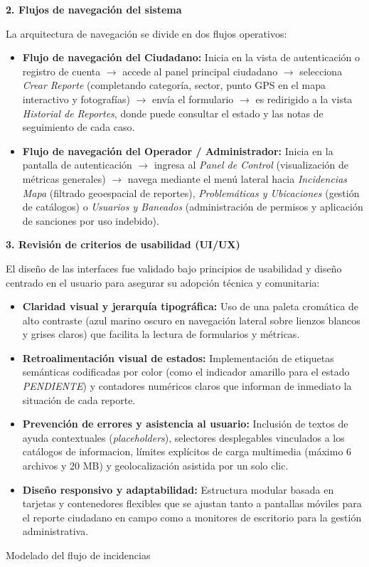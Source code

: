 { \vspace{0.5cm}
 \noindent\textbf{2. Flujos de navegación del sistema}
 \vspace{0.2cm}
 
 La arquitectura de navegación se divide en dos flujos operativos:
 \begin{itemize}
 	\item \textbf{Flujo de navegación del Ciudadano:} Inicia en la vista de autenticación o registro de cuenta $\rightarrow$ accede al panel principal ciudadano $\rightarrow$ selecciona \textit{Crear Reporte} (completando categoría, sector, punto GPS en el mapa interactivo y fotografías) $\rightarrow$ envía el formulario $\rightarrow$ es redirigido a la vista \textit{Historial de Reportes}, donde puede consultar el estado y las notas de seguimiento de cada caso.
 	\item \textbf{Flujo de navegación del Operador / Administrador:} Inicia en la pantalla de autenticación $\rightarrow$ ingresa al \textit{Panel de Control} (visualización de métricas generales) $\rightarrow$ navega mediante el menú lateral hacia \textit{Incidencias} \textit{Mapa} (filtrado geoespacial de reportes), \textit{Problemáticas y Ubicaciones} (gestión de catálogos) o \textit{Usuarios y Baneados} (administración de permisos y aplicación de sanciones por uso indebido).
 \end{itemize}
 
 \vspace{0.3cm}
 \noindent\textbf{3. Revisión de criterios de usabilidad (UI/UX)}
 \vspace{0.2cm}
 
 El diseño de las interfaces fue validado bajo principios de usabilidad y diseño centrado en el usuario para asegurar su adopción técnica y comunitaria:
 
 \begin{itemize}
 	\item \textbf{Claridad visual y jerarquía tipográfica:} Uso de una paleta cromática de alto contraste (azul marino oscuro en navegación lateral sobre lienzos blancos y grises claros) que facilita la lectura de formularios y métricas.
 	\item \textbf{Retroalimentación visual de estados:} Implementación de etiquetas semánticas codificadas por color (como el indicador amarillo para el estado \textit{PENDIENTE}) y contadores numéricos claros que informan de inmediato la situación de cada reporte.
 	\item \textbf{Prevención de errores y asistencia al usuario:} Inclusión de textos de ayuda contextuales (\textit{placeholders}), selectores desplegables vinculados a los catálogos de informacion, límites explícitos de carga multimedia (máximo 6 archivos y 20 MB) y geolocalización asistida por un solo clic.
 	\item \textbf{Diseño responsivo y adaptabilidad:} Estructura modular basada en tarjetas y contenedores flexibles que se ajustan tanto a pantallas móviles para el reporte ciudadano en campo como a monitores de escritorio para la gestión administrativa.
 \end{itemize}

 
 \hypertarget{subsec:modeladoFlujo}{Modelado del flujo de incidencias}
 
}